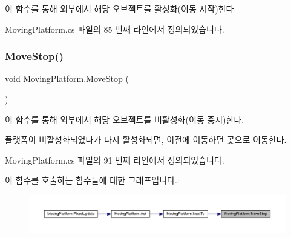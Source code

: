 이 함수를 통해 외부에서 해당 오브젝트를 활성화(이동 시작)한다. 



Moving\+Platform.\+cs 파일의 85 번째 라인에서 정의되었습니다.


\begin{DoxyCode}{0}

\end{DoxyCode}
\mbox{\label{class_moving_platform_a9150bceccb63034907ab3ec46216ae83}} 
\subsubsection{\texorpdfstring{MoveStop()}{MoveStop()}}
{\footnotesize\ttfamily void Moving\+Platform.\+Move\+Stop (\begin{DoxyParamCaption}{ }\end{DoxyParamCaption})}



이 함수를 통해 외부에서 해당 오브젝트를 비활성화(이동 중지)한다. 

플랫폼이 비활성화되었다가 다시 활성화되면, 이전에 이동하던 곳으로 이동한다. 

Moving\+Platform.\+cs 파일의 91 번째 라인에서 정의되었습니다.


\begin{DoxyCode}{0}

\end{DoxyCode}
이 함수를 호출하는 함수들에 대한 그래프입니다.\+:\nopagebreak
\begin{figure}[H]
\begin{center}
\leavevmode
\includegraphics[width=350pt]{df/d42/class_moving_platform_a9150bceccb63034907ab3ec46216ae83_icgraph}
\end{center}
\end{figure}
\mbox{\label{class_moving_platform_afb52616391e79cf7e015f5fb37d50e16}} 
